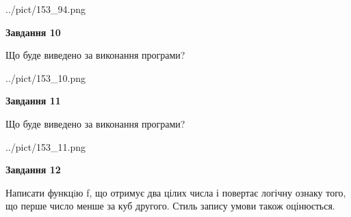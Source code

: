 \documentclass[12pt, ukrainian]{article}
\begin{document}
{\begin {large}
\begin{center}
	{../pict/153_94.png}
\end{center}
\newpage

{\begin {center}\textbf{Завдання 10}\end {center}}

Що буде виведено за виконання програми?\par
\begin{center}
	{../pict/153_10.png}
\end{center}
\newpage

{\begin {center}\textbf{Завдання 11}\end {center}}

Що буде виведено за виконання програми?\par
\begin{center}
	{../pict/153_11.png}
\end{center}
\newpage

{\begin {center}\textbf{Завдання 12}\end {center}}


Написати функцiю f, що отримує два цілих числа і повертає логічну ознаку того, що перше число менше за куб другого. Стиль запису умови також оцінюється.\par
\newpage

\end {large}}
\end{document}
